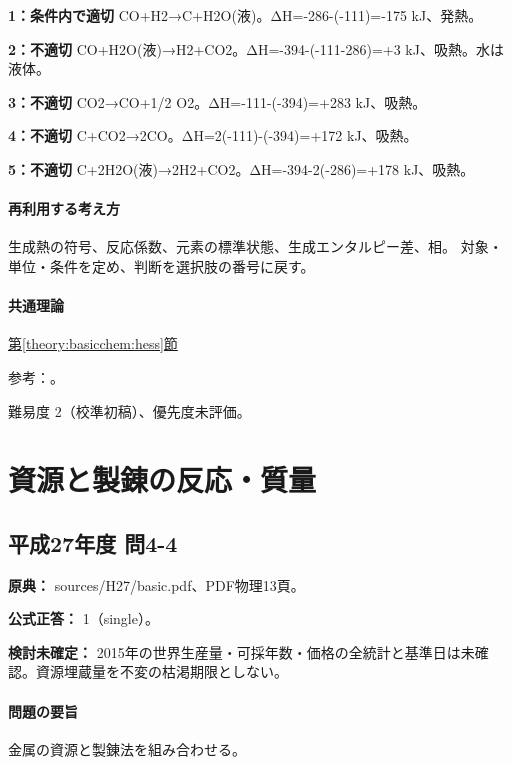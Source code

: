 \noindent\textbf{1：条件内で適切} CO+H2→C+H2O(液)。ΔH=-286-(-111)=-175 kJ、発熱。\par

\noindent\textbf{2：不適切} CO+H2O(液)→H2+CO2。ΔH=-394-(-111-286)=+3 kJ、吸熱。水は液体。\par

\noindent\textbf{3：不適切} CO2→CO+1/2 O2。ΔH=-111-(-394)=+283 kJ、吸熱。\par

\noindent\textbf{4：不適切} C+CO2→2CO。ΔH=\allowbreak{}2(-111)-(-394)=+172 kJ、吸熱。\par

\noindent\textbf{5：不適切} C+2H2O(液)→2H2+CO2。ΔH=-394-2(-286)=+178 kJ、吸熱。\par

\paragraph{再利用する考え方} 生成熱の符号、反応係数、元素の標準状態、生成エンタルピー差、相。 対象・単位・条件を定め、判断を選択肢の番号に戻す。

\paragraph{共通理論} \hyperref[theory:basicchem:hess]{第\ref*{theory:basicchem:hess}節}

\par 参考：\cite{openstax_hess}。

\par 難易度 2（校準初稿）、優先度未評価。

\section{資源と製錬の反応・質量}

\subsection{平成27年度 問4-4}
\label{q:h27-reg-basic-4-4}

\noindent\textbf{原典：} sources/H27/basic.pdf、PDF物理13頁。

\textbf{公式正答：} 1（single）。

\par\textbf{検討未確定：} 2015年の世界生産量・可採年数・価格の全統計と基準日は未確認。資源埋蔵量を不変の枯渇期限としない。

\paragraph{問題の要旨} 金属の資源と製錬法を組み合わせる。

